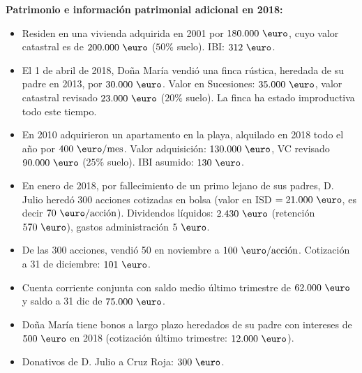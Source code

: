 \documentclass[11pt,a4paper,openany]{article}
\begin{document}
\begin{enunciadoBox}
\textbf{Patrimonio e información patrimonial adicional en 2018:}
\begin{itemize}[itemsep=1.5pt]
    \item Residen en una vivienda adquirida en 2001 por $180.000\text{ \euro}$, cuyo valor catastral es de $200.000\text{ \euro}$ ($50\%$ suelo). IBI: $312\text{ \euro}$.
    \item El 1 de abril de 2018, Doña María vendió una finca rústica, heredada de su padre en 2013, por $30.000\text{ \euro}$. Valor en Sucesiones: $35.000\text{ \euro}$, valor catastral revisado $23.000\text{ \euro}$ ($20\%$ suelo). La finca ha estado improductiva todo este tiempo.
    \item En 2010 adquirieron un apartamento en la playa, alquilado en 2018 todo el año por $400\text{ \euro/mes}$. Valor adquisición: $130.000\text{ \euro}$, VC revisado $90.000\text{ \euro}$ ($25\%$ suelo). IBI asumido: $130\text{ \euro}$.
    \item En enero de 2018, por fallecimiento de un primo lejano de sus padres, D. Julio heredó 300 acciones cotizadas en bolsa (valor en ISD $= 21.000\text{ \euro}$, es decir $70\text{ \euro/acción}$). Dividendos líquidos: $2.430\text{ \euro}$ (retención $570\text{ \euro}$), gastos administración $5\text{ \euro}$.
    \item De las 300 acciones, vendió 50 en noviembre a $100\text{ \euro/acción}$. Cotización a 31 de diciembre: $101\text{ \euro}$.
    \item Cuenta corriente conjunta con saldo medio último trimestre de $62.000\text{ \euro}$ y saldo a 31 dic de $75.000\text{ \euro}$.
    \item Doña María tiene bonos a largo plazo heredados de su padre con intereses de $500\text{ \euro}$ en 2018 (cotización último trimestre: $12.000\text{ \euro}$).
    \item Donativos de D. Julio a Cruz Roja: $300\text{ \euro}$.
\end{itemize}
\end{enunciadoBox}

\vspace{0.4cm}
\end{document}
